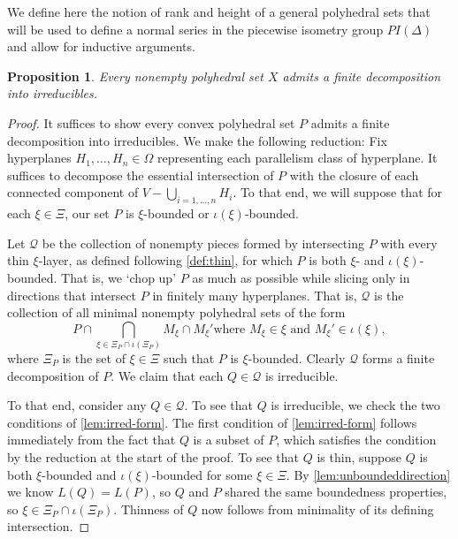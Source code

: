 \documentclass[11pt]{amsart}
\newtheorem{prop}[theorem]{Proposition}
\numberwithin{table}{section}
\numberwithin{figure}{section}
\theoremstyle{remark}
\begin{document}
We define here the notion of rank and height of a general polyhedral
sets that will be used to define a normal series in the piecewise
isometry group $PI(\Delta)$ and allow for inductive arguments.

\begin{prop} \label{prop:reduction} Every nonempty polyhedral set $X$
  admits a finite decomposition into irreducibles.
\end{prop}

\begin{proof}
  It suffices to show every convex polyhedral set $P$ admits a finite
  decomposition into irreducibles. We make the following reduction:
  Fix hyperplanes $H_1,\dotsc, H_n\in \Omega$ representing each
  parallelism class of hyperplane. It suffices to decompose the
  essential intersection of $P$ with the closure of each connected
  component of $V - \bigcup_{i=1,\dotsc, n} H_i$. To that end, we will
  suppose that for each $\xi\in \Xi$, our set $P$ is $\xi$-bounded or
  $\iota(\xi)$-bounded.
  
  Let $\mathcal{Q}$ be the collection of nonempty pieces formed by
  intersecting $P$ with every thin $\xi$-layer, as defined
  following \cref{def:thin}, for which $P$ is both $\xi$-
  and $\iota(\xi)$-bounded. That is, we `chop up' $P$ as much as
  possible while slicing only in directions that intersect $P$ in
  finitely many hyperplanes. That is, $\mathcal{Q}$ is the collection
  of all minimal nonempty polyhedral sets of the form
  \[ P \cap
    \bigcap_{\xi\in \Xi_P \cap \iota(\Xi_P)} M_\xi \cap M_\xi' \text{
      where } M_\xi\in \xi \text{ and }M_\xi'\in \iota(\xi),
  \]
  where $\Xi_P$ is the set of $\xi\in \Xi$ such that $P$ is
  $\xi$-bounded. Clearly $\mathcal{Q}$ forms a finite decomposition of
  $P$. We claim that each $Q\in \mathcal{Q}$ is irreducible.

  To that end, consider any $Q\in \mathcal{Q}$. To see that $Q$ is
  irreducible, we check the two conditions of
  \cref{lem:irred-form}. The first condition of \cref{lem:irred-form}
  follows immediately from the fact that $Q$ is a subset of $P$, which
  satisfies the condition by the reduction at the start of the proof.
  To see that $Q$ is thin, suppose $Q$ is both $\xi$-bounded and
  $\iota(\xi)$-bounded for some $\xi\in \Xi$.  By
  \cref{lem:unboundeddirection} we know $L(Q) = L(P)$, so $Q$ and $P$
  shared the same boundedness properties, so
  $\xi \in \Xi_P\cap \iota(\Xi_P)$. Thinness of $Q$ now follows
  from minimality of its defining intersection.
\end{proof}
\end{document}
